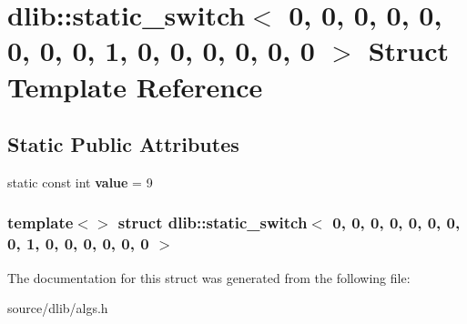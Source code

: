 \hypertarget{structdlib_1_1static__switch_3_010_00_010_00_010_00_010_00_010_00_010_00_010_00_010_00_011_00_010dd8c605dbfd043e236f91723a992215}{
\section{dlib::static\_\-switch$<$ 0, 0, 0, 0, 0, 0, 0, 0, 1, 0, 0, 0, 0, 0, 0 $>$ Struct Template Reference}
\label{structdlib_1_1static__switch_3_010_00_010_00_010_00_010_00_010_00_010_00_010_00_010_00_011_00_010dd8c605dbfd043e236f91723a992215}
}
\subsection*{Static Public Attributes}
\begin{DoxyCompactItemize}
\item 
\hypertarget{structdlib_1_1static__switch_3_010_00_010_00_010_00_010_00_010_00_010_00_010_00_010_00_011_00_010dd8c605dbfd043e236f91723a992215_a74c6ec197f7f540d8e941594e9848e74}{
static const int {\bfseries value} = 9}
\label{structdlib_1_1static__switch_3_010_00_010_00_010_00_010_00_010_00_010_00_010_00_010_00_011_00_010dd8c605dbfd043e236f91723a992215_a74c6ec197f7f540d8e941594e9848e74}

\end{DoxyCompactItemize}
\subsubsection*{template$<$$>$ struct dlib::static\_\-switch$<$ 0, 0, 0, 0, 0, 0, 0, 0, 1, 0, 0, 0, 0, 0, 0 $>$}



The documentation for this struct was generated from the following file:\begin{DoxyCompactItemize}
\item 
source/dlib/algs.h\end{DoxyCompactItemize}
